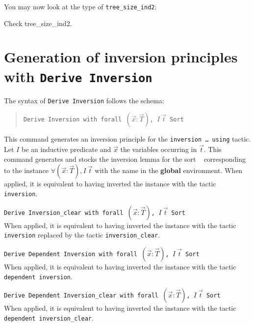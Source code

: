You may now look at the type of {\tt tree\_size\_ind2}:

\begin{coq_example}
Check tree_size_ind2.
\end{coq_example}

\section{Generation of inversion principles with \tt Derive Inversion}
\label{Derive-Inversion}

The syntax of {\tt Derive Inversion} follows the schema:
\begin{quote}
{\tt Derive Inversion {\ident} with forall
  $(\vec{x} : \vec{T})$, $I~\vec{t}$ Sort \sort}
\end{quote}

This command generates an inversion principle for the
\texttt{inversion \dots\ using} tactic.
Let $I$ be an inductive predicate and $\vec{x}$ the variables
occurring in $\vec{t}$. This command generates and stocks the
inversion lemma for the sort \sort~ corresponding to the instance
$\forall (\vec{x}:\vec{T}), I~\vec{t}$ with the name {\ident} in the {\bf
global} environment. When applied, it is equivalent to having inverted
the instance with the tactic {\tt inversion}.

\begin{Variants}
\item \texttt{Derive Inversion\_clear {\ident} with forall
  $(\vec{x}:\vec{T})$, $I~\vec{t}$ Sort \sort}\\
  When applied, it is equivalent to having
  inverted the instance with the tactic \texttt{inversion}
  replaced by the tactic \texttt{inversion\_clear}.
\item \texttt{Derive Dependent Inversion {\ident} with forall
  $(\vec{x}:\vec{T})$, $I~\vec{t}$ Sort \sort}\\
  When applied, it is equivalent to having
  inverted the instance with the tactic \texttt{dependent inversion}.
\item \texttt{Derive Dependent Inversion\_clear {\ident} with forall
  $(\vec{x}:\vec{T})$, $I~\vec{t}$ Sort \sort}\\
  When applied, it is equivalent to having
  inverted the instance with the tactic \texttt{dependent inversion\_clear}.
\end{Variants}

